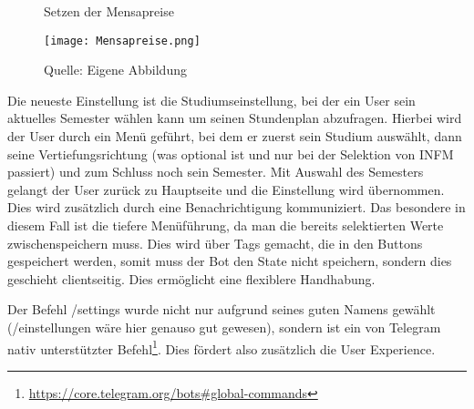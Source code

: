 \begin{figure}[H]
    \centering
    \caption{Setzen der Mensapreise}
      \texttt{[image: Mensapreise.png]}
      \label{img:mensapreise}
    \caption*{Quelle: Eigene Abbildung}
\end{figure}

Die neueste Einstellung ist die Studiumseinstellung, bei der ein User sein aktuelles Semester wählen kann um seinen Stundenplan abzufragen. Hierbei wird der User durch ein Menü geführt, bei dem er zuerst sein Studium auswählt, dann seine Vertiefungsrichtung (was optional ist und nur bei der Selektion von INFM passiert) und zum Schluss noch sein Semester. Mit Auswahl des Semesters gelangt der User zurück zu Hauptseite und die Einstellung wird übernommen. Dies wird zusätzlich durch eine Benachrichtigung kommuniziert. Das besondere in diesem Fall ist die tiefere Menüführung, da man die bereits selektierten Werte zwischenspeichern muss. Dies wird über Tags gemacht, die in den Buttons gespeichert werden, somit muss der Bot den State nicht speichern, sondern dies geschieht clientseitig. Dies ermöglicht eine flexiblere Handhabung.

Der Befehl /settings wurde nicht nur aufgrund seines guten Namens gewählt (/einstellungen wäre hier genauso gut gewesen), sondern ist ein von Telegram nativ unterstützter Befehl\footnote{\url{https://core.telegram.org/bots\#global-commands}}. Dies fördert also zusätzlich die User Experience.

